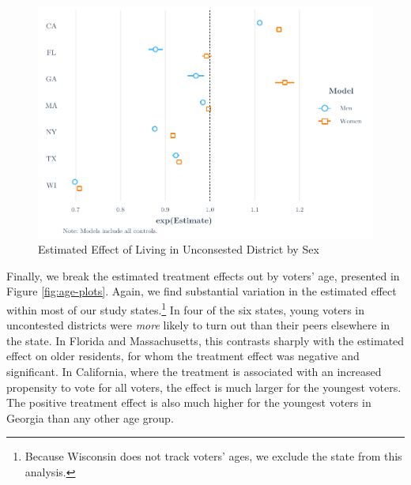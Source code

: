 \documentclass[
  12pt,
]{article}
\begin{document}
\begin{figure}[H]

{\centering \includegraphics{write_files/figure-latex/men-women-plots-1} 

}

\caption{\label{fig:men-women}Estimated Effect of Living in Unconsested District by Sex}\label{fig:men-women-plots}
\end{figure}

Finally, we break the estimated treatment effects out by voters' age, presented in Figure \ref{fig:age-plots}. Again, we find substantial variation in the estimated effect within most of our study states.\footnote{Because Wisconsin does not track voters' ages, we exclude the state from this analysis.} In four of the six states, young voters in uncontested districts were \emph{more} likely to turn out than their peers elsewhere in the state. In Florida and Massachusetts, this contrasts sharply with the estimated effect on older residents, for whom the treatment effect was negative and significant. In California, where the treatment is associated with an increased propensity to vote for all voters, the effect is much larger for the youngest voters. The positive treatment effect is also much higher for the youngest voters in Georgia than any other age group.
\end{document}
